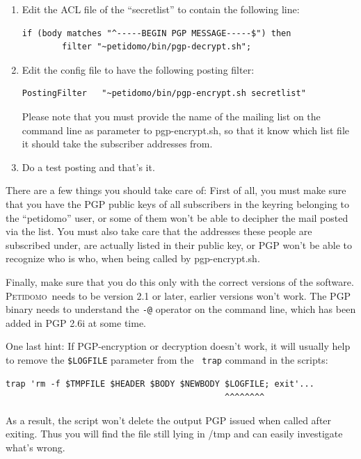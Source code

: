 \documentclass[a4paper,10pt]{scrreprt}
\newcommand{\Petidomo}{{\scshape Peti\-domo}}
\newcommand{\file}[1]{{\sf #1}}
\begin{document}
\begin{enumerate}
\item Edit the ACL file of the ``secretlist'' to contain the following
line:

\begin{verbatim}
if (body matches "^-----BEGIN PGP MESSAGE-----$") then
        filter "~petidomo/bin/pgp-decrypt.sh";
\end{verbatim}

\item Edit the config file to have the following posting filter:

\begin{verbatim}
PostingFilter   "~petidomo/bin/pgp-encrypt.sh secretlist"
\end{verbatim}

Please note that you must provide the name of the mailing list on the
command line as parameter to \file{pgp-encrypt.sh}, so that it know
which list file it should take the subscriber addresses from.

\item Do a test posting and that's it.

\end{enumerate}

There are a few things you should take care of: First of all, you must
make sure that you have the PGP public keys of all subscribers in the
keyring belonging to the ``petidomo'' user, or some of them won't be
able to decipher the mail posted via the list. You must also take care
that the addresses these people are subscribed under, are actually
listed in their public key, or PGP won't be able to recognize who is
who, when being called by \file{pgp-encrypt.sh}.

Finally, make sure that you do this only with the correct versions of
the software. \Petidomo\ needs to be version 2.1 or later, earlier
versions won't work. The PGP binary needs to understand the {\tt -@}
operator on the command line, which has been added in PGP 2.6i at some
time.

One last hint: If PGP-encryption or decryption doesn't work, it will
usually help to remove the {\tt \$LOGFILE} parameter from the {\tt
trap} command in the scripts:

\begin{verbatim}
trap 'rm -f $TMPFILE $HEADER $BODY $NEWBODY $LOGFILE; exit'...
                                            ^^^^^^^^
\end{verbatim}

As a result, the script won't delete the output PGP issued when called
after exiting. Thus you will find the file still lying in \file{/tmp}
and can easily investigate what's wrong.
\end{document}
